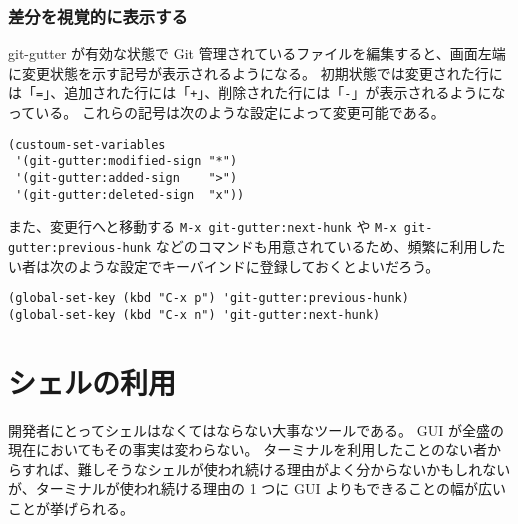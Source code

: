 \subsubsection{差分を視覚的に表示する}
git-gutter が有効な状態で Git 管理されているファイルを編集すると、画面左端に変更状態を示す記号が表示されるようになる。
初期状態では変更された行には「\texttt{=}」、追加された行には「\texttt{+}」、削除された行には「\texttt{-}」が表示されるようになっている。
これらの記号は次のような設定によって変更可能である。\enlargethispage{0.50zw}
\begin{mdframed}[roundcorner=0.50zw,leftmargin=3.00zw,rightmargin=3.00zw,skipabove=0.40zw,skipbelow=0.40zw,innertopmargin=4.00pt,innerbottommargin=4.00pt,innerleftmargin=5.00pt,innerrightmargin=5.00pt,linecolor=gray!020,linewidth=0.50pt,backgroundcolor=gray!20]
\begin{verbatim}
(custoum-set-variables
 '(git-gutter:modified-sign "*")
 '(git-gutter:added-sign    ">")
 '(git-gutter:deleted-sign  "x"))
\end{verbatim}
\end{mdframed}
また、変更行へと移動する \texttt{M-x git-gutter:next-hunk} や \texttt{M-x git-gutter:previous-hunk} などのコマンドも用意されているため、頻繁に利用したい者は次のような設定でキーバインドに登録しておくとよいだろう。
\begin{mdframed}[roundcorner=0.50zw,leftmargin=3.00zw,rightmargin=3.00zw,skipabove=0.40zw,skipbelow=0.40zw,innertopmargin=4.00pt,innerbottommargin=4.00pt,innerleftmargin=5.00pt,innerrightmargin=5.00pt,linecolor=gray!020,linewidth=0.50pt,backgroundcolor=gray!20]
\begin{verbatim}
(global-set-key (kbd "C-x p") 'git-gutter:previous-hunk)
(global-set-key (kbd "C-x n") 'git-gutter:next-hunk)
\end{verbatim}
\end{mdframed}
\section{シェルの利用}
開発者にとってシェルはなくてはならない大事なツールである。
GUI が全盛の現在においてもその事実は変わらない。
ターミナルを利用したことのない者からすれば、難しそうなシェルが使われ続ける理由がよく分からないかもしれないが、ターミナルが使われ続ける理由の 1 つに GUI よりもできることの幅が広いことが挙げられる。\\

